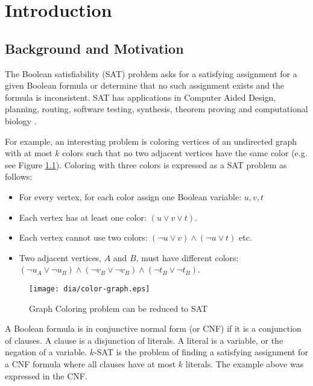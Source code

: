 \chapter{Introduction}

\section{Background and Motivation}

The Boolean satisfiability (SAT) problem asks for a satisfying
assignment for a given Boolean formula or determine that no such
assignment exists and the formula is inconsistent.  SAT has
applications in Computer Aided Design, planning, routing,
software testing, synthesis, theorem proving and computational
biology \cite{Smith_diagnosis, Soeken:2010:VUM:1870926.1871248,
demoura2008z3, Corblin07asat-based, Kautz:1992:PS:145448.146725}.

For example, an interesting problem is coloring vertices
of an undirected graph with at most $k$ colors such that no
two adjacent vertices have the same color (e.g. see Figure
\ref{fig:color-graph}). Coloring with three colors is expressed as
a SAT problem as follows:
\begin{itemize}
  \item For every vertex, for each color assign one Boolean variable: $u, v, t$
  \item Each vertex has at least one color: $(u \lor v \lor t)$.
  \item Each vertex cannot use two colors:
  $(\neg u \lor v) \land (\neg u \lor t)$ etc.
  \item Two adjacent vertices, $A$ and $B$, must have different colors:
  $(\neg u_A \lor \neg u_B) \land (\neg v_B \lor \neg v_B) \land (\neg t_B \lor \neg t_B)$.
\end{itemize}

\begin{figure}
  \centering
  \texttt{[image: dia/color-graph.eps]}
  \caption{Graph Coloring problem can be reduced to SAT}
  \label{fig:color-graph}
\end{figure}

A Boolean formula is in conjunctive normal form (or CNF) if it is
a conjunction of clauses. A clause is a disjunction of literals. A
literal is a variable, or the negation of a variable. $k$-SAT is
the problem of finding a satisfying assignment for a CNF formula
where all clauses have at most $k$ literals.  The example above
was expressed in the CNF.

